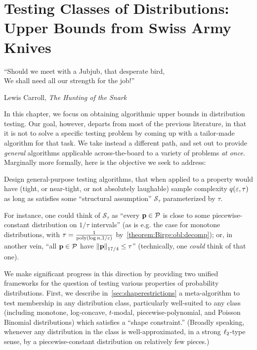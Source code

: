\chapter{Testing Classes of Distributions: Upper Bounds from Swiss Army Knives}\label{chap:unified:ub}

\epigraph{``Should we meet with a Jubjub, that desperate bird,\\
We shall need all our strength for the job!''}{Lewis Carroll, \textit{The Hunting of the Snark}}

\renewcommand{\theIRL}{\textsf{Succinctness}}
\newcommand*{\inlineref}[1]{\refstepcounter{IRL}({\theIRL})\label{#1}}
\newcommand{\RightComment}[1]{\Comment{\parbox[t]{.30\linewidth}{\small#1}}} %

In this chapter, we focus on obtaining algorithmic upper bounds in distribution testing. Our goal, however, departs from most of the previous literature, in that it is not to solve a specific testing problem by coming up with a tailor-made algorithm for that task. We take instead a different path, and set out to provide \emph{general} algorithms applicable across-the-board to a variety of problems \emph{at once}. Marginally more formally, here is the objective we seek to address:
\begin{problem}\label{problem:ub:general}
Design general-purpose testing algorithms, that when applied to a property \property would have (tight, or near-tight, or not absolutely laughable) sample complexity $q(\eps, \tau)$ as long as \property satisfies some ``structural assumption'' $\mathcal{S}_\tau$ parameterized by $\tau$.
\end{problem}
\noindent For instance, one could think of $\mathcal{S}_\tau$ as ``every $\D\in\property$ is close to some piecewise-constant distribution on $1/\tau$ intervals'' (as is e.g. the case for monotone distributions, with $\tau=\frac{1}{\poly(\log n, 1/\eps)}$ by~\cref{theorem:Birge:obl:decomp}); or, in another vein, ``all $\D\in\property$ have $\norm{\D}_{17/4} \leq \tau$'' (technically, one \emph{could} think of that one).  

We make significant progress in this direction by providing two unified frameworks for the question of testing various properties of probability distributions. First, we describe in~\cref{sec:shaperestrictions} a meta-algorithm to test membership in any distribution class, particularly well-suited to any class (including monotone, log-concave, $t$-modal, piecewise-polynomial, and Poisson Binomial distributions) which satisfies a ``shape constraint.'' (Broadly speaking, whenever any distribution in the class is well-approximated, in a strong $\lp[2]$-type sense, by a piecewise-constant distribution on relatively few pieces.)

